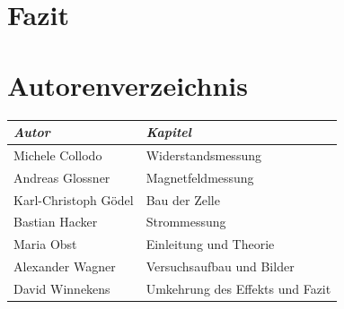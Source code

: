 \documentclass[11pt]{scrartcl}
\begin{document}
\section{Fazit}		%

\newpage
\section{Autorenverzeichnis}
\begin{tabular}{|l|l|}
\hline
\emph{Autor} & \emph{Kapitel}\\
\hline
Michele Collodo & Widerstandsmessung\\
Andreas Glossner & Magnetfeldmessung\\
Karl-Christoph G\"odel & Bau der Zelle\\
Bastian Hacker & Strommessung\\
Maria Obst & Einleitung und Theorie\\
Alexander Wagner & Versuchsaufbau und Bilder\\
David Winnekens & Umkehrung des Effekts und Fazit\\
\hline
\end{tabular}
\end{document}
